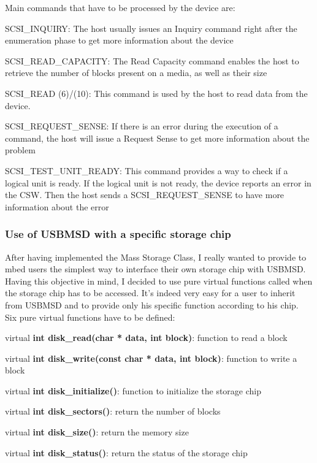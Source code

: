\documentclass[pdftex,10pt,a4paper]{report}
\newenvironment{packed_item}{
\begin{itemize}
  \setlength{\itemsep}{1pt}
  \setlength{\parskip}{0pt}
  \setlength{\parsep}{0pt}
}{\end{itemize}}
\begin{document}
Main commands that have to be processed by the device are:
\begin{packed_item}
	\item SCSI\_INQUIRY: The host usually issues an Inquiry command right after the enumeration phase to get more
information about the device

	\item SCSI\_READ\_CAPACITY: The Read Capacity command enables the host to retrieve the number of blocks present on a
media, as well as their size

	\item SCSI\_READ (6)/(10): This command is used by the host to read data from the device.
	
	\item SCSI\_REQUEST\_SENSE: If there is an error during the execution of a command, the host will issue a
Request Sense to get more information about the problem

	\item SCSI\_TEST\_UNIT\_READY: This command provides a way to check if a logical unit is ready. If the logical unit is not ready, the device reports an error in the CSW. Then the host sends a SCSI\_REQUEST\_SENSE to have more information about the error
\end{packed_item}

\subsubsection{Use of USBMSD with a specific storage chip}
After having implemented the Mass Storage Class, I really wanted to provide to mbed users the simplest way to interface their own storage chip with USBMSD. Having this objective in mind, I decided to use pure virtual functions called when the storage chip has to be accessed. It's indeed very easy for a user to inherit from USBMSD and to provide only his specific function according to his chip.\\

Six pure virtual functions have to be defined:
\begin{packed_item}
	\item virtual \textbf{int disk\_read(char * data, int block)}: function to read a block
	\item virtual \textbf{int disk\_write(const char * data, int block)}: function to write a block
	\item virtual \textbf{int disk\_initialize()}: function to initialize the storage chip
	\item virtual \textbf{int disk\_sectors()}: return the number of blocks
	\item virtual \textbf{int disk\_size()}: return the memory size
	\item virtual \textbf{int disk\_status()}: return the status of the storage chip
\end{packed_item}
\end{document}
